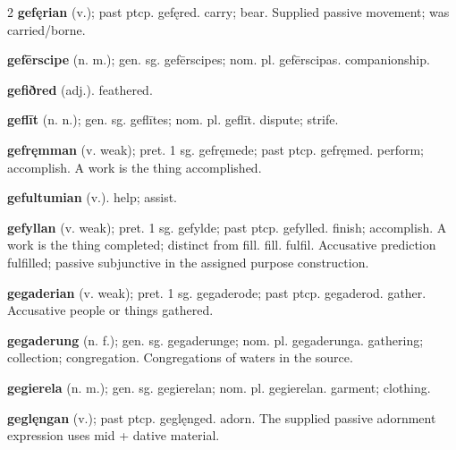\begin{multicols*}{2}
\textbf{gefęrian} (v.); past ptcp. gefęred. carry; bear. Supplied passive movement; was carried/borne.\par
\textbf{gefērscipe} (n. m.); gen. sg. gefērscipes; nom. pl. gefērscipas. companionship.\par
\textbf{gefiðred} (adj.). feathered.\par
\textbf{geflīt} (n. n.); gen. sg. geflītes; nom. pl. geflīt. dispute; strife.\par
\textbf{gefręmman} (v. weak); pret. 1 sg. gefręmede; past ptcp. gefręmed. perform; accomplish. A work is the thing accomplished.\par
\textbf{gefultumian} (v.). help; assist.\par
\textbf{gefyllan} (v. weak); pret. 1 sg. gefylde; past ptcp. gefylled. finish; accomplish. A work is the thing completed; distinct from fill. fill. fulfil. Accusative prediction fulfilled; passive subjunctive in the assigned purpose construction.\par
\textbf{gegaderian} (v. weak); pret. 1 sg. gegaderode; past ptcp. gegaderod. gather. Accusative people or things gathered.\par
\textbf{gegaderung} (n. f.); gen. sg. gegaderunge; nom. pl. gegaderunga. gathering; collection; congregation. Congregations of waters in the source.\par
\textbf{gegierela} (n. m.); gen. sg. gegierelan; nom. pl. gegierelan. garment; clothing.\par
\textbf{geglęngan} (v.); past ptcp. geglęnged. adorn. The supplied passive adornment expression uses mid + dative material.\par

\end{multicols*}
